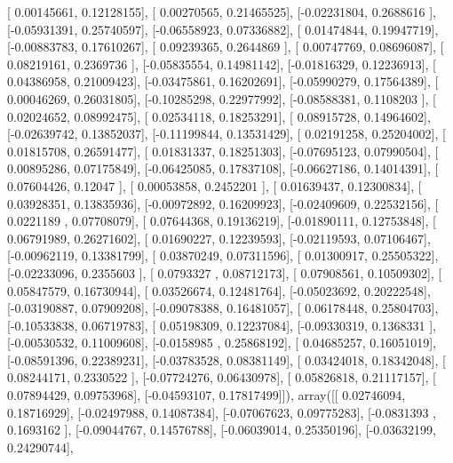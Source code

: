 \documentclass{article}
\begin{document}
       [ 0.00145661,  0.12128155],
       [ 0.00270565,  0.21465525],
       [-0.02231804,  0.2688616 ],
       [-0.05931391,  0.25740597],
       [-0.06558923,  0.07336882],
       [ 0.01474844,  0.19947719],
       [-0.00883783,  0.17610267],
       [ 0.09239365,  0.2644869 ],
       [ 0.00747769,  0.08696087],
       [ 0.08219161,  0.2369736 ],
       [-0.05835554,  0.14981142],
       [-0.01816329,  0.12236913],
       [ 0.04386958,  0.21009423],
       [-0.03475861,  0.16202691],
       [-0.05990279,  0.17564389],
       [ 0.00046269,  0.26031805],
       [-0.10285298,  0.22977992],
       [-0.08588381,  0.1108203 ],
       [ 0.02024652,  0.08992475],
       [ 0.02534118,  0.18253291],
       [ 0.08915728,  0.14964602],
       [-0.02639742,  0.13852037],
       [-0.11199844,  0.13531429],
       [ 0.02191258,  0.25204002],
       [ 0.01815708,  0.26591477],
       [ 0.01831337,  0.18251303],
       [-0.07695123,  0.07990504],
       [ 0.00895286,  0.07175849],
       [-0.06425085,  0.17837108],
       [-0.06627186,  0.14014391],
       [ 0.07604426,  0.12047   ],
       [ 0.00053858,  0.2452201 ],
       [ 0.01639437,  0.12300834],
       [ 0.03928351,  0.13835936],
       [-0.00972892,  0.16209923],
       [-0.02409609,  0.22532156],
       [ 0.0221189 ,  0.07708079],
       [ 0.07644368,  0.19136219],
       [-0.01890111,  0.12753848],
       [ 0.06791989,  0.26271602],
       [ 0.01690227,  0.12239593],
       [-0.02119593,  0.07106467],
       [-0.00962119,  0.13381799],
       [ 0.03870249,  0.07311596],
       [ 0.01300917,  0.25505322],
       [-0.02233096,  0.2355603 ],
       [ 0.0793327 ,  0.08712173],
       [ 0.07908561,  0.10509302],
       [ 0.05847579,  0.16730944],
       [ 0.03526674,  0.12481764],
       [-0.05023692,  0.20222548],
       [-0.03190887,  0.07909208],
       [-0.09078388,  0.16481057],
       [ 0.06178448,  0.25804703],
       [-0.10533838,  0.06719783],
       [ 0.05198309,  0.12237084],
       [-0.09330319,  0.1368331 ],
       [-0.00530532,  0.11009608],
       [-0.0158985 ,  0.25868192],
       [ 0.04685257,  0.16051019],
       [-0.08591396,  0.22389231],
       [-0.03783528,  0.08381149],
       [ 0.03424018,  0.18342048],
       [ 0.08244171,  0.2330522 ],
       [-0.07724276,  0.06430978],
       [ 0.05826818,  0.21117157],
       [ 0.07894429,  0.09753968],
       [-0.04593107,  0.17817499]]), array([[ 0.02746094,  0.18716929],
       [-0.02497988,  0.14087384],
       [-0.07067623,  0.09775283],
       [-0.0831393 ,  0.1693162 ],
       [-0.09044767,  0.14576788],
       [-0.06039014,  0.25350196],
       [-0.03632199,  0.24290744],
\end{document}
